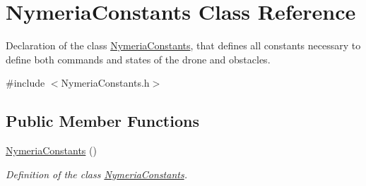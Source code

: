 \hypertarget{class_nymeria_constants}{}\section{Nymeria\+Constants Class Reference}
\label{class_nymeria_constants}


Declaration of the class \hyperlink{class_nymeria_constants}{Nymeria\+Constants}, that defines all constants necessary to define both commands and states of the drone and obstacles.  




{\ttfamily \#include $<$Nymeria\+Constants.\+h$>$}

\subsection*{Public Member Functions}
\begin{DoxyCompactItemize}
\item 
\hyperlink{class_nymeria_constants_aea06abeba1780d187a74d75b9313e2c4}{Nymeria\+Constants} ()
\begin{DoxyCompactList}\small\item\em Definition of the class \hyperlink{class_nymeria_constants}{Nymeria\+Constants}. \end{DoxyCompactList}\end{DoxyCompactItemize}
